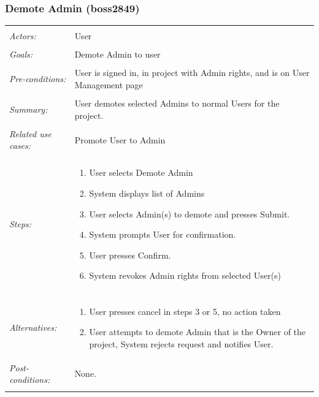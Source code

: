 \documentclass[11pt]{report}
\begin{document}
\subsubsection{Demote Admin  (boss2849)}
\begin{tabular}{ p{2cm} p{12cm} }
 \hline
 \\
 \textit{Actors:} & User \\ 
 \\
 \textit{Goals:} & Demote Admin to user \\
 \\
 \textit{Pre-conditions:} & User is signed in, in project with Admin rights, and is on User Management page \\
 \\
 \textit{Summary:} & User demotes selected Admins to normal Users for the project. \\ 
 \\
 \textit{Related use cases:} & Promote User to Admin \\ 
 \\
 \textit{Steps:} & \begin{enumerate}
  \item User selects Demote Admin
  \item System displays list of Admins
  \item User selects Admin(s) to demote and presses Submit.
  \item System prompts User for confirmation.
  \item User presses Confirm.
  \item System revokes Admin rights from selected User(s)
 \end{enumerate} \\
 \\
 \textit{Alternatives:} & \begin{enumerate}
  \item User presses cancel in steps 3 or 5, no action taken
  \item User attempts to demote Admin that is the Owner of the project, System rejects request and notifies User.
 \end{enumerate}
 \\
 \textit{Post-conditions:} & None. \\
 \\
\hline
\end{tabular}
\end{document}

